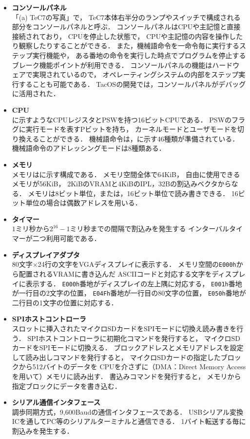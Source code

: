 \begin{itemize}
\item {\bf コンソールパネル} \\
「(a) TeC7の写真」で，
TeC7本体右半分のランプやスイッチで構成される部分をコンソールパネルと呼ぶ．
コンソールパネルはCPUや主記憶と直接接続されており，
CPUを停止した状態で，
CPUや主記憶の内容を操作したり観察したりすることができる．
また，機械語命令を一命令毎に実行するステップ実行機能や，
ある番地の命令を実行した時点でプログラムを停止する
ブレーク機能ポイントが利用できる．
コンソールパネルの機能はハードウェアで実現されているので，
オペレーティングシステムの内部をステップ実行することも可能である．
TacOSの開発では，コンソールパネルがデバッグに活用された．

\item {\bf CPU} \\
に示すようなCPUレジスタとPSWを持つ16ビットCPUである．
PSWのフラグに実行モードを表すPビットを持ち，
カーネルモードとユーザモードを切り換えることができる．
機械語命令は，に示す46種類が準備されている．
機械語命令のアドレッシングモードは8種類ある．

\item {\bf メモリ} \\
メモリはに示す構成である．
メモリ空間全体で64KiB，
自由に使用できるメモリが56KiB，
2KiBのVRAMと4KiBのIPL，32Bの割込みベクタからなる．
メモリは8ビット単位，または，16ビット単位で読み書きできる．
16ビット単位の場合は偶数アドレスを用いる．

\item {\bf タイマー} \\
$1$ミリ秒から$2^{16}-1$ミリ秒までの間隔で割込みを発生する
インターバルタイマーが二つ利用可能である．

\item {\bf ディスプレイアダプタ} \\
80文字×24行の文字をVGAディスプレイに表示する．
メモリ空間の{\tt E000h}から配置されるVRAMに書き込んだ
ASCIIコードと対応する文字をディスプレイに表示する．
{\tt E000h}番地がディスプレイの左上隅に対応する，
{\tt E001h}番地が一行目の2文字の位置，
{\tt E04Fh}番地が一行目の80文字の位置，
{\tt E050h}番地が二行目の1文字の位置に対応する．

\item {\bf SPIホストコントローラ} \\
スロットに挿入されたマイクロSDカードをSPIモードに切換え読み書きを行う．
SPIホストコントローラに初期化コマンドを発行すると，
マイクロSDカードをSPIモードに切換える．
ブロックアドレスとメモリアドレスを設定して読み出しコマンドを発行すると，
マイクロSDカードの指定したブロックから512バイトのデータを
CPUを介さずに（DMA：Direct Memory Accessを用いて）メモリに読み出す．
書込みコマンドを発行すると，
メモリから指定ブロックにデータを書き込む．

\item {\bf シリアル通信インタフェース} \\
調歩同期方式，9,600Baudの通信インタフェースである．
USBシリアル変換ICを通してPC等のシリアルターミナルと通信できる．
1バイト転送する毎に割込みを発生する．

\end{itemize}

